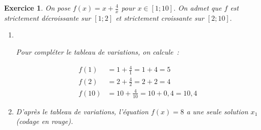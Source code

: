 \documentclass[10pt]{article}
\newtheorem{exo}{Exercice}
\begin{document}
\begin{exo}

On pose $f(x)=x+\frac{4}{x}$ pour $x\in\left[1;10\right].$ On admet que $f$ est strictement décroissante sur $\left[1;2\right]$ et strictement croissante sur $\left[2;10\right].$ 

\medskip

\setlength{\columnseprule}{1pt}

\begin{multicols}{2}


\begin{enumerate}
\item ~{}

\begin{center}
\end{center}

Pour compléter le tableau de variations, on calcule~:

\begin{align*}
f(1)&=1+\frac{4}{1}=1+4=5\\
f(2)&=2+\frac{4}{2}=2+2=4\\
f(10)&=10+\frac{4}{10}=10+0,4=10,4
\end{align*}

\item D'après le tableau de variations, l'équation $f(x)=8$ a une seule solution $x_1$ (codage en rouge).

\end{enumerate}
\end{multicols}

\end{exo}
\end{document}
